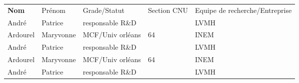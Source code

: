 


\renewcommand{\arraystretch}{1}%
\begin{tabular}{|m{2cm}|m{2cm}|m{2cm}|m{1cm}|m{8cm}|}
\cline{1-5}

\cellcolor{couleurFonce} \color{white}\bfseries \bfseries Nom & \cellcolor{couleurFonce} \color{white} Prénom & \cellcolor{couleurFonce} \color{white} Grade/Statut & \cellcolor{couleurFonce} \color{white} Section CNU & \cellcolor{couleurFonce} \color{white} Equipe de recherche/Entreprise \\ \cline{1-5}
 \color{black} André & \color{black} Patrice & \color{black} responsable R\&D & \color{black} & \color{black} LVMH \\ \cline{1-5}

 \cellcolor{couleurClaire} \color{couleurTexte} Ardourel  & \cellcolor{couleurClaire} \color{couleurTexte} Maryvonne & \cellcolor{couleurClaire} \color{couleurTexte} MCF/Univ orléans & \cellcolor{couleurClaire} \color{couleurTexte} 64 & \cellcolor{couleurClaire} \color{couleurTexte} INEM \\ \cline{1-5}

 \color{black} André & \color{black} Patrice & \color{black} responsable R\&D & \color{black} & \color{black} LVMH \\ \cline{1-5}

 \cellcolor{couleurClaire} \color{couleurTexte} Ardourel  & \cellcolor{couleurClaire} \color{couleurTexte} Maryvonne & \cellcolor{couleurClaire} \color{couleurTexte} MCF/Univ orléans & \cellcolor{couleurClaire} \color{couleurTexte} 64 & \cellcolor{couleurClaire} \color{couleurTexte} INEM \\ \cline{1-5}

 \color{black} André & \color{black} Patrice & \color{black} responsable R\&D & \color{black} & \color{black} LVMH \\ \cline{1-5}


\end{tabular}
